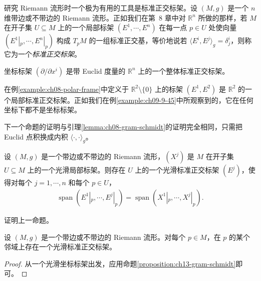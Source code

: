 \documentclass[../../main.tex]{subfiles}
\begin{document}
研究 Riemann 流形时一个极为有用的工具是标准正交标架。设 $(M,g)$ 是一个 $n$ 维带边或不带边的 Riemann 流形。正如我们在第~8 章中对 $\mathbb{R}^n$ 所做的那样，若 $M$ 在开子集 $U\subseteq M$ 上的一个局部标架 $(E^1,\cdots ,E^n)$ 在每一点 $p\in U$ 处使向量 $(E^1|_p,\cdots ,E^n|_p)$ 构成 $T_pM$ 的一组标准正交基，等价地说若 $\langle E^i,E^j\rangle_g=\delta^i_j$，则称它为一个\emph{标准正交标架}。

\begin{example}\label{example:ch13-coord-frame-orthonormal}
坐标标架 $(\partial/\partial x^i)$ 是带 Euclid 度量的 $\mathbb{R}^n$ 上的一个整体标准正交标架。
\end{example}

\begin{example}\label{example:ch13-polar-frame}
在例\ref{example:ch08-polar-frame}中定义于 $\mathbb{R}^2\setminus\{0\}$ 上的标架 $(E^1,E^2)$ 是 $\mathbb{R}^2$ 的一个局部标准正交标架。正如我们在例\ref{example:ch09-9-45}中所观察到的，它在任何坐标下都不是坐标标架。
\end{example}

下一个命题的证明与引理\ref{lemma:ch08-gram-schmidt}的证明完全相同，只需把 Euclid 点积换成内积 $\langle\cdot,\cdot\rangle_g$。

\begin{proposition}\label{proposition:ch13-gram-schmidt}
设 $(M,g)$ 是一个带边或不带边的 Riemann 流形，$(X^j)$ 是 $M$ 在开子集 $U\subseteq M$ 上的一个光滑局部标架。则存在 $U$ 上的一个光滑标准正交标架 $(E^j)$，使得对每个 $j=1,\cdots ,n$ 和每个 $p\in U$，
\begin{align*}
\operatorname{span}(E^1|_p,\cdots ,E^j|_p)=\operatorname{span}(X^1|_p,\cdots ,X^j|_p).
\end{align*}
\end{proposition}

\begin{exercise}\label{exercise:ch13-07}
证明上一命题。
\end{exercise}

\begin{corollary}[局部标准正交标架的存在性]\label{corollary:ch13-local-orthonormal}
设 $(M,g)$ 是一个带边或不带边的 Riemann 流形。对每个 $p\in M$，在 $p$ 的某个邻域上存在一个光滑标准正交标架。
\end{corollary}

\begin{proof}
从一个光滑坐标标架出发，应用命题\ref{proposition:ch13-gram-schmidt}即可。
\end{proof}
\end{document}
